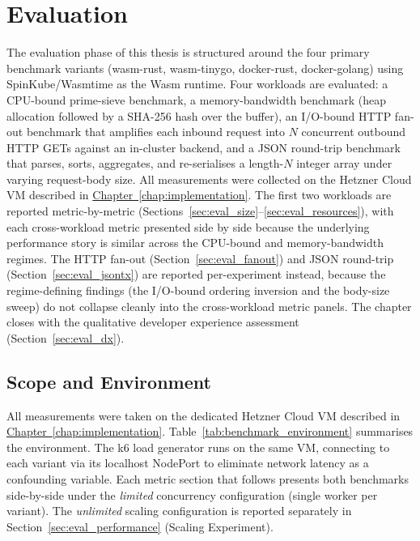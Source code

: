 \chapter{Evaluation}
\label{chap:evaluation}

The evaluation phase of this thesis is structured around the four primary benchmark variants (wasm-rust, wasm-tinygo, docker-rust, docker-golang) using SpinKube/Wasmtime as the \acs{Wasm} runtime. Four workloads are evaluated: a \acs{CPU}-bound prime-sieve benchmark, a memory-bandwidth benchmark (heap allocation followed by a SHA-256 hash over the buffer), an I/O-bound HTTP fan-out benchmark that amplifies each inbound request into $N$ concurrent outbound \acs{HTTP} GETs against an in-cluster backend, and a \acs{JSON} round-trip benchmark that parses, sorts, aggregates, and re-serialises a length-$N$ integer array under varying request-body size. All measurements were collected on the Hetzner Cloud \acs{VM} described in \hyperref[chap:implementation]{Chapter~\ref{chap:implementation}}. The first two workloads are reported metric-by-metric (Sections~\ref{sec:eval_size}--\ref{sec:eval_resources}), with each cross-workload metric presented side by side because the underlying performance story is similar across the \acs{CPU}-bound and memory-bandwidth regimes. The HTTP fan-out (Section~\ref{sec:eval_fanout}) and \acs{JSON} round-trip (Section~\ref{sec:eval_jsontx}) are reported per-experiment instead, because the regime-defining findings (the I/O-bound ordering inversion and the body-size sweep) do not collapse cleanly into the cross-workload metric panels. The chapter closes with the qualitative developer experience assessment (Section~\ref{sec:eval_dx}).

\section{Scope and Environment}
\label{sec:eval_scope}

All measurements were taken on the dedicated Hetzner Cloud \acs{VM} described in \hyperref[chap:implementation]{Chapter~\ref{chap:implementation}}. Table~\ref{tab:benchmark_environment} summarises the environment. The k6 load generator runs on the same \acs{VM}, connecting to each variant via its localhost \acs{NodePort} to eliminate network latency as a confounding variable. Each metric section that follows presents both benchmarks side-by-side under the \emph{limited} concurrency configuration (single worker per variant). The \emph{unlimited} scaling configuration is reported separately in Section~\ref{sec:eval_performance} (Scaling Experiment).

